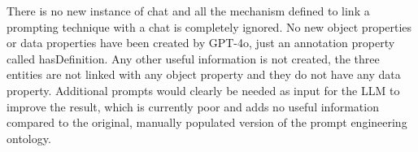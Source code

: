 There is no new instance of chat and all the mechanism defined to link a prompting technique with a chat is completely ignored.
No new object properties or data properties have been created by GPT-4o, just an annotation property called hasDefinition. Any other useful information is not created, the three entities are not linked with any object property and they do not have any data property. Additional prompts would clearly be needed as input for the LLM to improve the result, which is currently poor and adds no useful information compared to the original, manually populated version of the prompt engineering ontology.